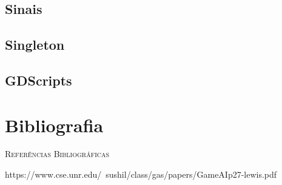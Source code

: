 \subsection{Sinais}
\subsection{Singleton}
\subsection{GDScripts}




\section{Bibliografia}

\textsc{Referências Bibliográficas} 

https://www.cse.unr.edu/~sushil/class/gas/papers/GameAIp27-lewis.pdf